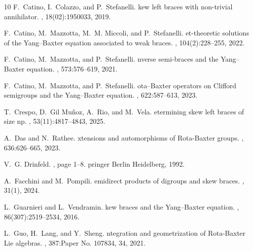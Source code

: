 \documentclass{jonasart}
\theoremstyle{plain}
\begin{document}
{\begin{thebibliography}{10}
        F.~{C}atino, I.~{C}olazzo, and P.~{S}tefanelli.
        kew left braces with non-trivial annihilator.
        ,
        18(02):1950033, 2019.
        
        F.~{C}atino, M.~{M}azzotta, M.~M. {M}iccoli, and P.~{S}tefanelli.
        et-theoretic solutions of the {Y}ang--{B}axter equation
        associated to weak braces.
        , 104(2):228–255, 2022.
        
        F.~{C}atino, M.~{M}azzotta, and P.~{S}tefanelli.
        nverse semi-braces and the {Y}ang--{B}axter equation.
        , 573:576–619, 2021.
        
        F.~{C}atino, M.~{M}azzotta, and P.~{S}tefanelli.
        ota--{B}axter operators on {C}lifford semigroups and the
        {Y}ang--{B}axter equation.
        , 622:587–613, 2023.
        
        T.~{C}respo, D.~{G}il {M}uñoz, A.~{R}io, and M.~{V}ela.
        etermining skew left braces of size np.
        , 53(11):4817–4843, 2025.
        
        A.~{D}as and N.~{R}athee.
        xtensions and automorphisms of {R}ota-{B}axter groups.
        , 636:626–665, 2023.
        
        V.~G. {D}rinfeld.
        , page
        1–8.
        pringer {B}erlin {H}eidelberg, 1992.
        
        A.~{F}acchini and M.~{P}ompili.
        emidirect products of digroups and skew braces.
        , 31(1), 2024.
        
        L.~{G}uarnieri and L.~{V}endramin.
        kew braces and the {Y}ang--{B}axter equation.
        , 86(307):2519–2534, 2016.
        
        L.~{G}uo, H.~{L}ang, and Y.~{S}heng.
        ntegration and geometrization of {R}ota-{B}axter {L}ie algebras.
        , 387:{P}aper {N}o. 107834, 34,
        2021.
        

\end{thebibliography}}
\end{document}
